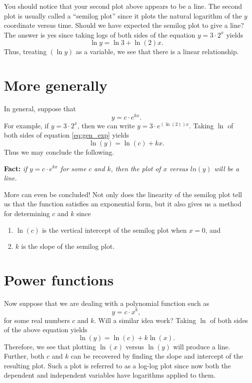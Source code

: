 You should notice that your second plot above appears to be a line.
The second plot is usually called a ``semilog plot'' since it plots
the natural logarithm of the $y$ coordinate versus time.  Should we
have expected the semilog plot to give a line?  The answer is yes
since taking logs of both sides of the equation $y = 3\cdot 2^x$
yields
\[
\ln y = \ln 3 + \ln(2) x.
\]
Thus, treating $(\ln y)$ as a variable, we see that there is a linear
relationship.  

\section{More generally}
\noindent In general, suppose that
\begin{equation}\label{eq:gen_exp}
  y = c \cdot e^{kx}.
\end{equation}
For example, if $y = 3\cdot 2^x$, then we can write $y = 3\cdot
e^{(\ln(2) )x}.$ Taking $\ln$ of both sides of equation
\eqref{eq:gen_exp} yields
\[
\ln(y) = \ln(c) + k x.
\]
Thus we may conclude the following.

\bigskip
\noindent\textbf{Fact: } \emph{ if $y= c\cdot e^{kx}$ for some $c$ and
$k$, then the plot of $x$ versus $ln(y)$ will be a line.}
\bigskip

More can even be concluded!  Not only does the linearity of the
semilog plot tell us that the function satisfies an exponential form,
but it also gives us a method for determining $c$ and $k$ since
\begin{enumerate}
\item $\ln(c)$ is the vertical intercept of the semilog plot when $x =
  0$, and
\item $k$ is the slope of the semilog plot.
\end{enumerate}

\section{Power functions}
Now suppose that we are dealing with a polynomial function such as
\begin{equation*}
  y = c\cdot {x}^k,
\end{equation*}
for some real numbers $c$ and $k$.  Will a similar idea work?  Taking
$\ln$ of both sides of the above equation yields
\begin{equation*}
  \ln (y) = \ln(c) + k \ln(x).
\end{equation*}
Therefore, we see that plotting $\ln(x)$ versus $\ln(y)$ will produce
a line.  Further, both $c$ and $k$ can be recovered by finding the
slope and intercept of the resulting plot.  Such a plot is referred to
as a log-log plot since now both the dependent and independent
variables have logarithms applied to them.

